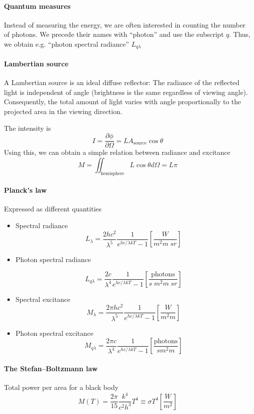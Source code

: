 \documentclass[article]{memoir}
\newcommand{\unit}[1]{\left[#1\right]}
\begin{document}
\paragraph{Quantum measures}
Instead of measuring the energy, we are often interested in counting the number of photons. We precede their names with ``photon'' and use the subscript \(q\). Thus, we obtain e.g. ``photon spectral radiance'' \(L_{q\lambda}\)

\paragraph{Lambertian source}
A Lambertian source is an ideal diffuse reflector: The radiance of the reflected light is independent of angle (brightness is the same regardless of viewing angle). Consequently, the total amount of light varies with angle proportionally to the projected area in the viewing direction.

The intensity is
\[
    I = \frac{\partial \phi}{\partial \Omega} = L A_{\text{source}} \cos{\theta}
\]
Using this, we can obtain a simple relation between radiance and excitance
\[
    M = \iint_{\text{hemisphere}} L \cos{\theta} d \Omega = L \pi
\]

\paragraph{Planck's law}
Expressed as different quantities
\begin{itemize}
    \item Spectral radiance
	\[
	    L_\lambda = \frac{2hc^2}{\lambda^5} \frac{1}{e^{hc/\lambda k T} - 1} \unit{\frac{W}{m^2 m \; sr}}
	\]
	
    \item Photon spectral radiance

	\[
	    L_{q\lambda} = \frac{2c}{\lambda^4} \frac{1}{e^{hc/\lambda k T} - 1} \unit{\frac{\text{photons}}{s \;m^2 m \; sr}}
	\]
    \item Spectral excitance
	\[
	    M_{\lambda} = \frac{2\pi h c^2}{\lambda^5} \frac{1}{e^{hc/\lambda k T} - 1} \unit{\frac{W}{m^2 m}}
	\]
	

    \item Photon spectral excitance
	\[
	    M_{q\lambda} = \frac{2\pi c}{\lambda^4} \frac{1}{e^{hc/\lambda k T} - 1} \unit{\frac{\text{photons}}{s m^2 m}}
	\]
\end{itemize}

\paragraph{The Stefan--Boltzmann law}
Total power per area for a black body
\[
    M(T) = \frac{2 \pi}{15} \frac{k^4}{c^2 h^3}T^4 \equiv \sigma T^4 \unit{\frac{W}{m^2}}
\]
\end{document}
